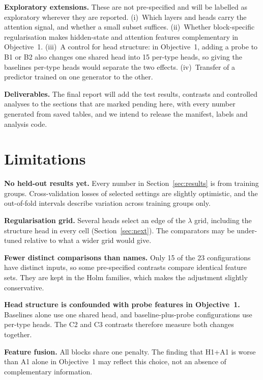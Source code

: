 \documentclass[10pt]{article}
\begin{document}
\textbf{Exploratory extensions.} These are not pre-specified and will be labelled as exploratory wherever they are
reported. (i)~Which layers and heads carry the attention signal, and whether a small subset suffices. (ii)~Whether
block-specific regularisation makes hidden-state and attention features complementary in Objective~1. (iii)~A control
for head structure: in Objective~1, adding a probe to B1 or B2 also changes one shared head into 15 per-type heads, so
giving the baselines per-type heads would separate the two effects. (iv)~Transfer of a predictor trained on one
generator to the other.

\textbf{Deliverables.} The final report will add the test results, contrasts and controlled analyses to the sections
that are marked pending here, with every number generated from saved tables, and we intend to release the manifest,
labels and analysis code.

\section{Limitations}
\label{sec:limits}

\textbf{No held-out results yet.} Every number in Section~\ref{sec:results} is from training groups. Cross-validation
losses of selected settings are slightly optimistic, and the out-of-fold intervals describe variation across training
groups only.

\textbf{Regularisation grid.} Several heads select an edge of the $\lambda$ grid, including the structure head in every
cell (Section~\ref{sec:next}). The comparators may be under-tuned relative to what a wider grid would give.

\textbf{Fewer distinct comparisons than names.} Only 15 of the 23 configurations have distinct inputs, so some
pre-specified contrasts compare identical feature sets. They are kept in the Holm families, which makes the adjustment
slightly conservative.

\textbf{Head structure is confounded with probe features in Objective~1.} Baselines alone use one shared head, and
baseline-plus-probe configurations use per-type heads. The C2 and C3 contrasts therefore measure both changes together.

\textbf{Feature fusion.} All blocks share one penalty. The finding that H1+A1 is worse than A1 alone in Objective~1 may
reflect this choice, not an absence of complementary information.
\end{document}
